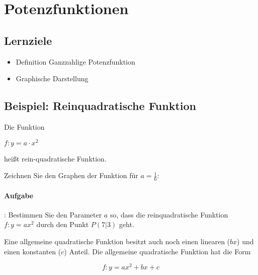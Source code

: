 \section{Potenzfunktionen}

\subsection*{Lernziele}

\begin{itemize}
\item Definition Ganzzahlige Potenzfunktion
\item Graphische Darstellung
\end{itemize}


\subsection{Beispiel: Reinquadratische Funktion}
Die Funktion

$f: y = a\cdot{}x^2$

heißt rein-quadratische Funktion.

Zeichnen Sie den Graphen der Funktion für $a=\frac{1}{6}$:



\newpage

\paragraph{Aufgabe}:  Bestimmen Sie den Parameter $a$ so, dass die reinquadratische Funktion $f: y=ax^2$ durch den Punkt $P(7| 3)$ geht.


\begin{bemerkung}{}{}
Eine allgemeine quadratische Funktion besitzt auch noch einen linearen ($bx$) und einen konstanten ($c$) Anteil. Die allgemeine quadratische Funktion hat die Form

$$f: y= ax^2 + bx + c$$
\end{bemerkung}


\newpage

